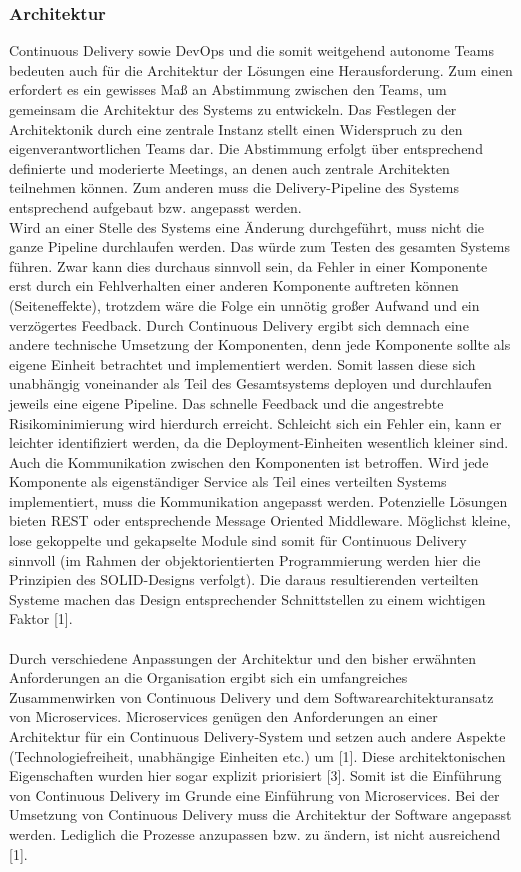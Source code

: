 \subsubsection{Architektur}
Continuous Delivery sowie DevOps und die somit weitgehend autonome Teams bedeuten auch für die Architektur der Lösungen eine Herausforderung. Zum einen erfordert es ein gewisses Maß an Abstimmung zwischen den Teams, um gemeinsam die Architektur des Systems zu entwickeln. Das Festlegen der Architektonik durch eine zentrale Instanz stellt einen Widerspruch zu den eigenverantwortlichen Teams dar. Die Abstimmung erfolgt über entsprechend definierte und moderierte Meetings, an denen auch zentrale Architekten teilnehmen können. Zum anderen muss die Delivery-Pipeline des Systems entsprechend aufgebaut bzw. angepasst werden.\\ Wird an einer Stelle des Systems eine Änderung durchgeführt, muss nicht die ganze Pipeline durchlaufen werden. Das würde zum Testen des gesamten Systems führen. Zwar kann dies durchaus sinnvoll sein, da Fehler in einer Komponente erst durch ein Fehlverhalten einer anderen Komponente auftreten können (Seiteneffekte), trotzdem wäre die Folge ein unnötig großer Aufwand und ein verzögertes Feedback. Durch Continuous Delivery ergibt sich demnach eine andere technische Umsetzung der Komponenten, denn jede Komponente sollte als eigene Einheit betrachtet und implementiert werden. Somit lassen diese sich unabhängig voneinander als Teil des Gesamtsystems deployen und durchlaufen jeweils eine eigene Pipeline. Das schnelle Feedback und die angestrebte Risikominimierung wird hierdurch erreicht. Schleicht sich ein Fehler ein, kann er leichter identifiziert werden, da die Deployment-Einheiten wesentlich kleiner sind. Auch die Kommunikation zwischen den Komponenten ist betroffen. Wird jede Komponente als eigenständiger Service als Teil eines verteilten Systems implementiert, muss die Kommunikation angepasst werden. Potenzielle Lösungen bieten REST oder entsprechende Message Oriented Middleware. Möglichst kleine, lose gekoppelte und gekapselte Module sind somit für Continuous Delivery sinnvoll (im Rahmen der objektorientierten Programmierung werden hier die Prinzipien des SOLID-Designs verfolgt). Die daraus resultierenden verteilten Systeme machen das Design entsprechender Schnittstellen zu einem wichtigen Faktor [1]. \\ \\
Durch verschiedene Anpassungen der Architektur und den bisher erwähnten Anforderungen an die Organisation ergibt sich ein umfangreiches Zusammenwirken von Continuous Delivery und dem Softwarearchitekturansatz von Microservices. Microservices genügen den Anforderungen an einer Architektur für ein Continuous Delivery-System und setzen auch andere Aspekte (Technologiefreiheit, unabhängige Einheiten etc.) um [1]. Diese architektonischen Eigenschaften wurden hier sogar explizit priorisiert [3]. Somit ist die Einführung von Continuous Delivery im Grunde eine Einführung von Microservices. Bei der Umsetzung von Continuous Delivery muss die Architektur der Software angepasst werden. Lediglich die Prozesse anzupassen bzw. zu ändern, ist nicht ausreichend [1].

